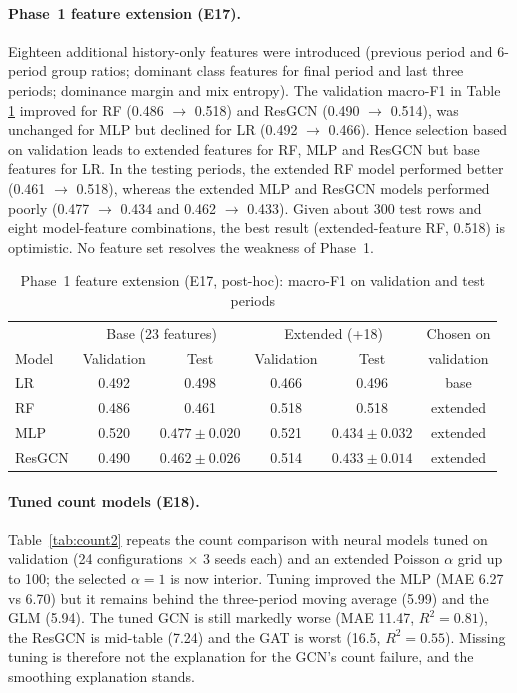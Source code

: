 \documentclass[11pt,a4paper]{report}
\begin{document}
\paragraph{Phase~1 feature extension (E17).} Eighteen additional history-only features were introduced (previous period and 6-period group ratios; dominant class features for final period and last three periods; dominance margin and mix entropy). The validation macro-F1 in Table \ref{tab:p1x} improved for RF (0.486 $\to$ 0.518) and ResGCN (0.490 $\to$ 0.514), was unchanged for MLP but declined for LR (0.492 $\to$ 0.466). Hence selection based on validation leads to extended features for RF, MLP and ResGCN but base features for LR. In the testing periods, the extended RF model performed better (0.461 $\to$ 0.518), whereas the extended MLP and ResGCN models performed poorly (0.477 $\to$ 0.434 and 0.462 $\to$ 0.433). Given about 300 test rows and eight model-feature combinations, the best result (extended-feature RF, 0.518) is optimistic. No feature set resolves the weakness of Phase~1.

\begin{table}[H]
\centering\small
\caption{Phase~1 feature extension (E17, post-hoc): macro-F1 on validation and test periods}
\label{tab:p1x}
\begin{tabular}{@{}lccccc@{}}
\toprule
 & \multicolumn{2}{c}{Base (23 features)} & \multicolumn{2}{c}{Extended (+18)} & Chosen on\\
Model & Validation & Test & Validation & Test & validation\\
\midrule
LR & 0.492 & 0.498 & 0.466 & 0.496 & base\\
RF & 0.486 & 0.461 & 0.518 & 0.518 & extended\\
MLP & 0.520 & $0.477\pm0.020$ & 0.521 & $0.434\pm0.032$ & extended\\
ResGCN & 0.490 & $0.462\pm0.026$ & 0.514 & $0.433\pm0.014$ & extended\\
\bottomrule
\end{tabular}
\end{table}

\paragraph{Tuned count models (E18).} Table~\ref{tab:count2} repeats the count comparison with neural models tuned on validation (24 configurations $\times$ 3 seeds each) and an extended Poisson $\alpha$ grid up to 100; the selected $\alpha=1$ is now interior. Tuning improved the MLP (MAE 6.27 vs 6.70) but it remains behind the three-period moving average (5.99) and the GLM (5.94). The tuned GCN is still markedly worse (MAE 11.47, $R^2=0.81$), the ResGCN is mid-table (7.24) and the GAT is worst (16.5, $R^2=0.55$). Missing tuning is therefore not the explanation for the GCN's count failure, and the smoothing explanation stands.
\end{document}
